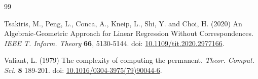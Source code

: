 \documentclass[10pt]{article}
\theoremstyle{remark}%
\theoremstyle{definition}%
\begin{document}
\begin{thebibliography}{99}
{%


Tsakiris, M., Peng, L., Conca, A., Kneip, L., Shi, Y. and Choi, H. (2020) An Algebraic-Geometric Approach for Linear Regression Without Correspondences. {\em IEEE T. Inform. Theory} \textbf{66}, 5130-5144. doi: \href{https://doi.org/10.1109/tit.2020.2977166}{10.1109/tit.2020.2977166}. 

Valiant, L. (1979) The complexity of computing the permanent. {\em Theor. Comput. Sci.} \textbf{8} 189-201. doi: \href{https://doi.org/10.1016/0304-3975(79)90044-6}{10.1016/0304-3975(79)90044-6}. 
}
\end{thebibliography}

\end{document}
